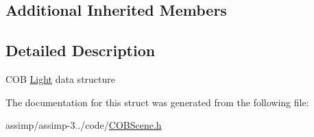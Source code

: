 \subsection*{Additional Inherited Members}


\subsection{Detailed Description}
C\+O\+B \hyperlink{struct_assimp_1_1_c_o_b_1_1_light}{Light} data structure 

The documentation for this struct was generated from the following file\+:\begin{DoxyCompactItemize}
\item 
assimp/assimp-\/3../code/\hyperlink{_c_o_b_scene_8h}{C\+O\+B\+Scene.\+h}\end{DoxyCompactItemize}
